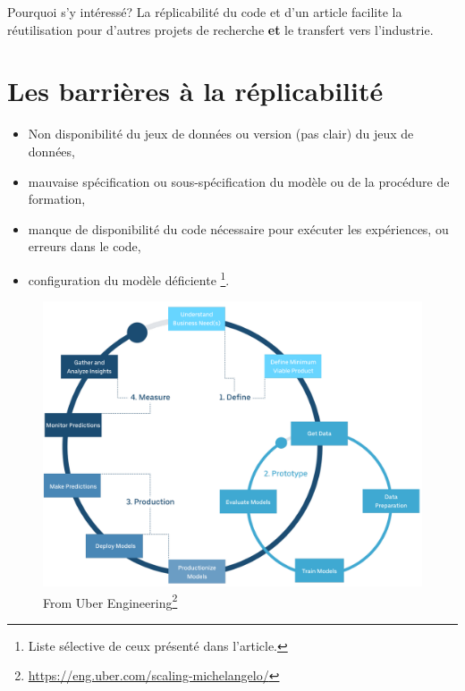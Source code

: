 \documentclass{beamer}
\begin{document}
	\begin{frame}{Pourquoi s'y intéressé?}
		La réplicabilité du code et d'un article facilite la réutilisation pour d'autres projets de recherche \textbf{et} le transfert vers l'industrie. 
	\end{frame}
	
	\section{Les barrières à la réplicabilité}
	
		\begin{frame}
			\begin{itemize}
				\item Non disponibilité du jeux de données ou version (pas clair) du jeux de données, 
				\item mauvaise spécification ou sous-spécification du modèle ou de la procédure de formation,
				\item manque de disponibilité du code nécessaire pour exécuter les expériences, ou erreurs dans le code,
				\item configuration du modèle déficiente \cite{pineau2020improving}\footnote{Liste sélective de ceux présenté dans l'article.}.
			\end{itemize}
		\end{frame}
	
	\begin{frame}
		\begin{figure}
			\centering
			\includegraphics[scale=0.15]{cycle.png}
			\caption{From Uber Engineering\footnote{\url{https://eng.uber.com/scaling-michelangelo/}}}
		\end{figure}
	\end{frame}
	
\end{document}

